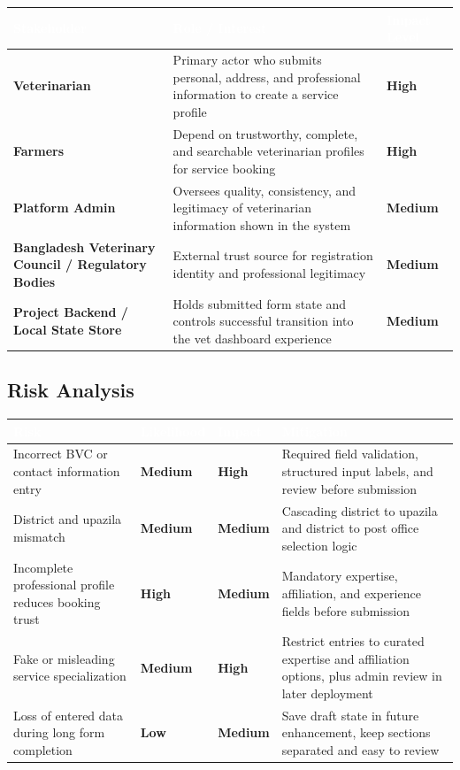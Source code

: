 \documentclass[12pt]{article}
\begin{document}
\begin{longtable}{|p{3cm}|p{6cm}|p{3cm}|}
\hline
\rowcolor{headerblue}\textcolor{white}{\textbf{Stakeholder}} & \textcolor{white}{\textbf{Role / Interest}} & \textcolor{white}{\textbf{Impact Level}} \\
\hline
\textbf{Veterinarian} & Primary actor who submits personal, address, and professional information to create a service profile & \textbf{High} \\
\hline
\rowcolor{rowgray}
\textbf{Farmers} & Depend on trustworthy, complete, and searchable veterinarian profiles for service booking & \textbf{High} \\
\hline
\textbf{Platform Admin} & Oversees quality, consistency, and legitimacy of veterinarian information shown in the system & \textbf{Medium} \\
\hline
\rowcolor{rowgray}
\textbf{Bangladesh Veterinary Council / Regulatory Bodies} & External trust source for registration identity and professional legitimacy & \textbf{Medium} \\
\hline
\textbf{Project Backend / Local State Store} & Holds submitted form state and controls successful transition into the vet dashboard experience & \textbf{Medium} \\
\hline
\end{longtable}

\subsection{Risk Analysis}

\begin{longtable}{|p{3.8cm}|p{2.5cm}|p{2.5cm}|p{4cm}|}
\hline
\rowcolor{headerblue}\textcolor{white}{\textbf{Risk}} & \textcolor{white}{\textbf{Likelihood}} & \textcolor{white}{\textbf{Impact}} & \textcolor{white}{\textbf{Mitigation}} \\
\hline
Incorrect BVC or contact information entry & \textcolor{medrisk}{\textbf{Medium}} & \textcolor{highrisk}{\textbf{High}} & Required field validation, structured input labels, and review before submission \\
\hline
\rowcolor{rowgray}
District and upazila mismatch & \textcolor{medrisk}{\textbf{Medium}} & \textcolor{medrisk}{\textbf{Medium}} & Cascading district to upazila and district to post office selection logic \\
\hline
Incomplete professional profile reduces booking trust & \textcolor{highrisk}{\textbf{High}} & \textcolor{medrisk}{\textbf{Medium}} & Mandatory expertise, affiliation, and experience fields before submission \\
\hline
\rowcolor{rowgray}
Fake or misleading service specialization & \textcolor{medrisk}{\textbf{Medium}} & \textcolor{highrisk}{\textbf{High}} & Restrict entries to curated expertise and affiliation options, plus admin review in later deployment \\
\hline
Loss of entered data during long form completion & \textcolor{lowrisk}{\textbf{Low}} & \textcolor{medrisk}{\textbf{Medium}} & Save draft state in future enhancement, keep sections separated and easy to review \\
\hline
\end{longtable}
\end{document}
